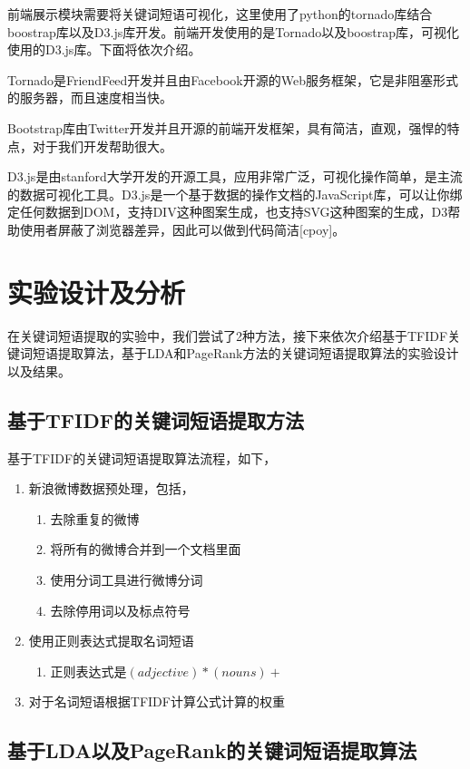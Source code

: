 \documentclass[master]{njuthesis}
\begin{document}
    前端展示模块需要将关键词短语可视化，这里使用了python的tornado库结合boostrap库以及D3.js库开发。前端开发使用的是Tornado以及boostrap库，可视化使用的D3.js库。下面将依次介绍。
    
    Tornado是FriendFeed开发并且由Facebook开源的Web服务框架，它是非阻塞形式的服务器，而且速度相当快。
    
    Bootstrap库由Twitter开发并且开源的前端开发框架，具有简洁，直观，强悍的特点，对于我们开发帮助很大。
    
    D3.js是由stanford大学开发的开源工具，应用非常广泛，可视化操作简单，是主流的数据可视化工具。D3.js是一个基于数据的操作文档的JavaScript库，可以让你绑定任何数据到DOM，支持DIV这种图案生成，也支持SVG这种图案的生成，D3帮助使用者屏蔽了浏览器差异，因此可以做到代码简洁[cpoy]。


\section{实验设计及分析}
  
    在关键词短语提取的实验中，我们尝试了2种方法，接下来依次介绍基于TFIDF关键词短语提取算法，基于LDA和PageRank方法的关键词短语提取算法的实验设计以及结果。

\subsection{基于TFIDF的关键词短语提取方法}
    
    基于TFIDF的关键词短语提取算法流程，如下，
    \begin{enumerate}
      \item 新浪微博数据预处理，包括，
	\begin{enumerate}
	  \item 去除重复的微博
	  \item 将所有的微博合并到一个文档里面
	  \item 使用分词工具进行微博分词
	  \item 去除停用词以及标点符号
         \end{enumerate}
      \item 使用正则表达式提取名词短语
	\begin{enumerate}
	  \item 正则表达式是$\left(adjective\right)*\left(nouns\right)+$
	\end{enumerate}
      \item 对于名词短语根据TFIDF计算公式计算的权重
    \end{enumerate}	

\subsection{基于LDA以及PageRank的关键词短语提取算法}
  
\end{document}
